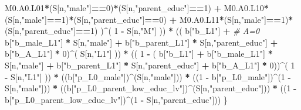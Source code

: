 \documentclass[
]{book}
\newenvironment{Shaded}{\begin{snugshade}}{\end{snugshade}}
\newcommand{\CommentTok}[1]{\textcolor[rgb]{0.56,0.35,0.01}{\textit{#1}}}
\newcommand{\DecValTok}[1]{\textcolor[rgb]{0.00,0.00,0.81}{#1}}
\newcommand{\NormalTok}[1]{#1}
\newcommand{\SpecialCharTok}[1]{\textcolor[rgb]{0.81,0.36,0.00}{\textbf{#1}}}
\newcommand{\StringTok}[1]{\textcolor[rgb]{0.31,0.60,0.02}{#1}}
\begin{document}
\begin{Shaded}
\begin{Highlighting}[]
\NormalTok{          M0.A0.L01}\SpecialCharTok{*}\NormalTok{(S[n,}\StringTok{"male"}\NormalTok{]}\SpecialCharTok{==}\DecValTok{0}\NormalTok{)}\SpecialCharTok{*}\NormalTok{(S[n,}\StringTok{"parent\_educ"}\NormalTok{]}\SpecialCharTok{==}\DecValTok{1}\NormalTok{) }\SpecialCharTok{+}
\NormalTok{          M0.A0.L10}\SpecialCharTok{*}\NormalTok{(S[n,}\StringTok{"male"}\NormalTok{]}\SpecialCharTok{==}\DecValTok{1}\NormalTok{)}\SpecialCharTok{*}\NormalTok{(S[n,}\StringTok{"parent\_educ"}\NormalTok{]}\SpecialCharTok{==}\DecValTok{0}\NormalTok{) }\SpecialCharTok{+} 
\NormalTok{          M0.A0.L11}\SpecialCharTok{*}\NormalTok{(S[n,}\StringTok{"male"}\NormalTok{]}\SpecialCharTok{==}\DecValTok{1}\NormalTok{)}\SpecialCharTok{*}\NormalTok{(S[n,}\StringTok{"parent\_educ"}\NormalTok{]}\SpecialCharTok{==}\DecValTok{1}\NormalTok{) )}\SpecialCharTok{\^{}}\NormalTok{( }\DecValTok{1} \SpecialCharTok{{-}}\NormalTok{ S[n,}\StringTok{"M"}\NormalTok{] )) }\SpecialCharTok{*}
\NormalTok{      (( b[}\StringTok{"b\_L1"}\NormalTok{] }\SpecialCharTok{+}                                                            \CommentTok{\# A=0}
\NormalTok{           b[}\StringTok{"b\_male\_L1"}\NormalTok{] }\SpecialCharTok{*}\NormalTok{ S[n,}\StringTok{"male"}\NormalTok{] }\SpecialCharTok{+}  
\NormalTok{           b[}\StringTok{"b\_parent\_L1"}\NormalTok{] }\SpecialCharTok{*}\NormalTok{ S[n,}\StringTok{"parent\_educ"}\NormalTok{] }\SpecialCharTok{+}
\NormalTok{           b[}\StringTok{"b\_A\_L1"}\NormalTok{] }\SpecialCharTok{*} \DecValTok{0}\NormalTok{)}\SpecialCharTok{\^{}}\NormalTok{( S[n,}\StringTok{"L1"}\NormalTok{] )) }\SpecialCharTok{*}
\NormalTok{      (( }\DecValTok{1} \SpecialCharTok{{-}}\NormalTok{ ( b[}\StringTok{"b\_L1"}\NormalTok{] }\SpecialCharTok{+}
\NormalTok{                 b[}\StringTok{"b\_male\_L1"}\NormalTok{] }\SpecialCharTok{*}\NormalTok{ S[n,}\StringTok{"male"}\NormalTok{] }\SpecialCharTok{+}  
\NormalTok{                 b[}\StringTok{"b\_parent\_L1"}\NormalTok{] }\SpecialCharTok{*}\NormalTok{ S[n,}\StringTok{"parent\_educ"}\NormalTok{] }\SpecialCharTok{+}
\NormalTok{                 b[}\StringTok{"b\_A\_L1"}\NormalTok{] }\SpecialCharTok{*} \DecValTok{0}\NormalTok{))}\SpecialCharTok{\^{}}\NormalTok{( }\DecValTok{1} \SpecialCharTok{{-}}\NormalTok{ S[n,}\StringTok{"L1"}\NormalTok{] )) }\SpecialCharTok{*}
\NormalTok{      ((b[}\StringTok{"p\_L0\_male"}\NormalTok{])}\SpecialCharTok{\^{}}\NormalTok{(S[n,}\StringTok{"male"}\NormalTok{])) }\SpecialCharTok{*} 
\NormalTok{      ((}\DecValTok{1} \SpecialCharTok{{-}}\NormalTok{ b[}\StringTok{"p\_L0\_male"}\NormalTok{])}\SpecialCharTok{\^{}}\NormalTok{(}\DecValTok{1} \SpecialCharTok{{-}}\NormalTok{ S[n,}\StringTok{"male"}\NormalTok{])) }\SpecialCharTok{*} 
\NormalTok{      ((b[}\StringTok{"p\_L0\_parent\_low\_educ\_lv"}\NormalTok{])}\SpecialCharTok{\^{}}\NormalTok{(S[n,}\StringTok{"parent\_educ"}\NormalTok{])) }\SpecialCharTok{*}
\NormalTok{      ((}\DecValTok{1} \SpecialCharTok{{-}}\NormalTok{ b[}\StringTok{"p\_L0\_parent\_low\_educ\_lv"}\NormalTok{])}\SpecialCharTok{\^{}}\NormalTok{(}\DecValTok{1} \SpecialCharTok{{-}}\NormalTok{ S[n,}\StringTok{"parent\_educ"}\NormalTok{])) }
\NormalTok{    \}}
  

\end{Highlighting}
\end{Shaded}
\end{document}

